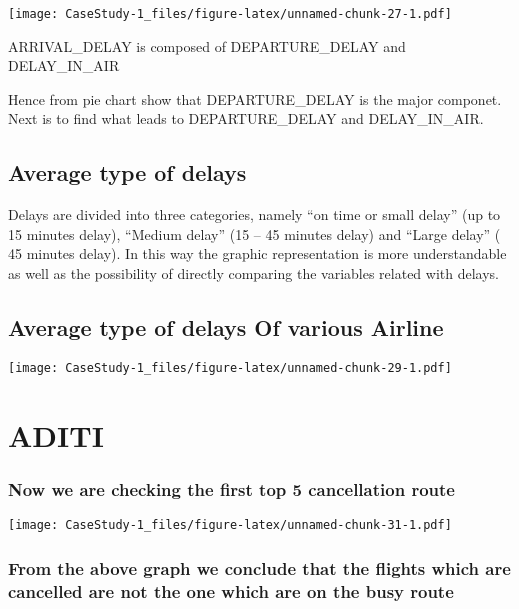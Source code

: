 \documentclass[]{article}
\begin{document}
\texttt{[image: CaseStudy-1\_files/figure-latex/unnamed-chunk-27-1.pdf]}

ARRIVAL\_DELAY is composed of DEPARTURE\_DELAY and DELAY\_IN\_AIR

Hence from pie chart show that DEPARTURE\_DELAY is the major componet.
Next is to find what leads to DEPARTURE\_DELAY and DELAY\_IN\_AIR.

\hypertarget{average-type-of-delays}{%
\subsection{Average type of delays}\label{average-type-of-delays}}

Delays are divided into three categories, namely ``on time or small
delay'' (up to 15 minutes delay), ``Medium delay'' (15 -- 45 minutes
delay) and ``Large delay'' ( 45 minutes delay). In this way the graphic
representation is more understandable as well as the possibility of
directly comparing the variables related with delays.

\hypertarget{average-type-of-delays-of-various-airline}{%
\subsection{Average type of delays Of various
Airline}\label{average-type-of-delays-of-various-airline}}

\texttt{[image: CaseStudy-1\_files/figure-latex/unnamed-chunk-29-1.pdf]}

\hypertarget{aditi}{%
\section{ADITI}\label{aditi}}

\hypertarget{now-we-are-checking-the-first-top-5-cancellation-route}{%
\subsubsection{Now we are checking the first top 5 cancellation
route}\label{now-we-are-checking-the-first-top-5-cancellation-route}}

\texttt{[image: CaseStudy-1\_files/figure-latex/unnamed-chunk-31-1.pdf]}

\hypertarget{from-the-above-graph-we-conclude-that-the-flights-which-are-cancelled-are-not-the-one-which-are-on-the-busy-route}{%
\subsubsection{From the above graph we conclude that the flights which
are cancelled are not the one which are on the busy
route}\label{from-the-above-graph-we-conclude-that-the-flights-which-are-cancelled-are-not-the-one-which-are-on-the-busy-route}}
\end{document}
